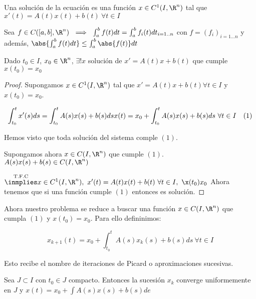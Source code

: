 \begin{ndef}

  Una solución de la ecuación es una función $x \in C^1 (I, \R ^n )$ tal que $x'(t) = A(t) x(t) + b(t) \ \forall t \in I$

\end{ndef}

Sea $f\in C([a,b], \R ^n ) \ \implies \ \int_a ^b f(t) dt = \int _a ^b f_i (t) dt _{i = 1..n} $ con $f = (f_i)_{i = 1...n}$ y además, $ \abs{ \int _a ^b f(t) dt } \leq \int_a ^b \abs{f(t)} dt $

\begin{nth}

  Dado $t_0 \in I$, $x_0 \in \R ^n $, $\exists ! x $ solución de $x' = A(t)x+b(t)$ que cumple $x(t_0) = x_0 $

\end{nth}

\begin{proof}

  Supongamos $x \in C^1 (I, \R ^n) $ tal que $x' = A(t) x + b(t) \forall t \in I$ y $x(t_0) = x_0$.

  \[
  \int _{t_0} ^t x'(s) ds = \int _{t_0} ^t A(s)x(s) + b(s) ds\\
  x(t) = x_0 + \int _{t_0} ^t A(s)x(s) + b(s) ds \ \forall t \in I \ \ \ (1)
  \]

  Hemos visto que toda solución del sistema comple $(1)$.

  \begin{rcases}
    Supongamos ahora $x \in C (I, \R ^n)$ que cumple $(1)$.\\
    $A(s)x(s) + b(s) \in C (I, \R ^n )$\\

  \end{rcases}
  $\overset{\text{T.F.C}}{\inmplies} x \in C ^1 (I, \R^n), \ x'(t) = A(t)x(t) + b(t) \ \forall t \in I, \ \x(t_0 ) x_0 $
  Ahora tenemos que si una función cumple $(1)$ entonces es solución.


\end{proof}

Ahora nuestro problema se reduce a buscar una función $x \in C (I , \R ^n)$ que cumpla $(1)$ y $x(t_0) = x_0 $.
Para ello defininimos:

\[
x_{k+1} (t) = x_0 + \int _{t_0} ^t A(s)x_k (s) + b(s) ds \ \forall t \in I
\]

Esto recibe el nombre de iteraciones de Picard o aproximaciones sucesivas.

Sea $J \subset I$ con $t_0 \in J$ compacto. Entonces la sucesión ${x_k}$ converge uniformemente en $J$ y $x(t) = x_0 + \int A(s)x(s) + b(s) de $

